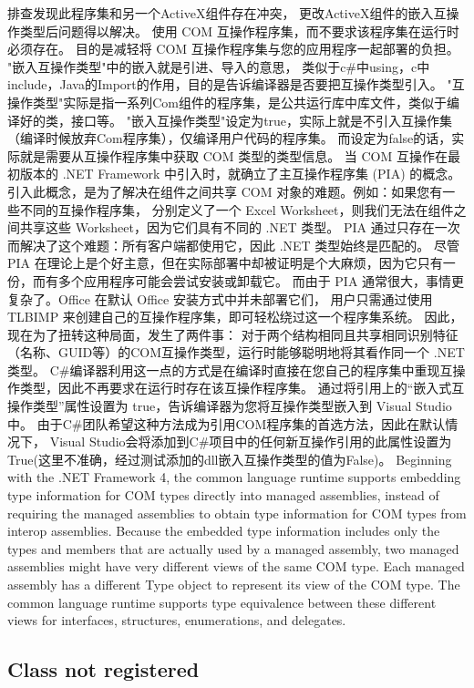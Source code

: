 \documentclass{book}
\begin{document}
排查发现此程序集和另一个ActiveX组件存在冲突，
更改ActiveX组件的嵌入互操作类型后问题得以解决。
使用 COM 互操作程序集，而不要求该程序集在运行时必须存在。
目的是减轻将 COM 互操作程序集与您的应用程序一起部署的负担。
"嵌入互操作类型"中的嵌入就是引进、导入的意思，
类似于c\#中using，c中include，Java的Import的作用，目的是告诉编译器是否要把互操作类型引入。
"互操作类型"实际是指一系列Com组件的程序集，是公共运行库中库文件，类似于编译好的类，接口等。
"嵌入互操作类型"设定为true，实际上就是不引入互操作集（编译时候放弃Com程序集），仅编译用户代码的程序集。
而设定为false的话，实际就是需要从互操作程序集中获取 COM 类型的类型信息。
当 COM 互操作在最初版本的 .NET Framework 中引入时，就确立了主互操作程序集 (PIA) 的概念。
引入此概念，是为了解决在组件之间共享 COM 对象的难题。例如：如果您有一些不同的互操作程序集，
分别定义了一个 Excel Worksheet，则我们无法在组件之间共享这些 Worksheet，因为它们具有不同的 .NET 类型。
PIA 通过只存在一次而解决了这个难题：所有客户端都使用它，因此 .NET 类型始终是匹配的。
尽管 PIA 在理论上是个好主意，但在实际部署中却被证明是个大麻烦，因为它只有一份，而有多个应用程序可能会尝试安装或卸载它。
而由于 PIA 通常很大，事情更复杂了。Office 在默认 Office 安装方式中并未部署它们，
用户只需通过使用 TLBIMP 来创建自己的互操作程序集，即可轻松绕过这一个程序集系统。
因此，现在为了扭转这种局面，发生了两件事：
对于两个结构相同且共享相同识别特征（名称、GUID等）的COM互操作类型，运行时能够聪明地将其看作同一个 .NET 类型。
C\#编译器利用这一点的方式是在编译时直接在您自己的程序集中重现互操作类型，因此不再要求在运行时存在该互操作程序集。
通过将引用上的“嵌入式互操作类型”属性设置为 true，告诉编译器为您将互操作类型嵌入到 Visual Studio 中。
由于C\#团队希望这种方法成为引用COM程序集的首选方法，因此在默认情况下，
Visual Studio会将添加到C\#项目中的任何新互操作引用的此属性设置为True(这里不准确，经过测试添加的dll嵌入互操作类型的值为False)。
Beginning with the .NET Framework 4, the common language runtime supports embedding type 
information for COM types directly into managed assemblies, 
instead of requiring the managed assemblies to obtain type information for COM types from interop assemblies.  
Because the embedded type information includes only the types and members that are actually used by a managed assembly, 
two managed assemblies might have very different views of the same COM type.  
Each managed assembly has a different Type object to represent its view of the COM type.  
The common language runtime supports type equivalence between these different views for interfaces,
 structures, enumerations, and delegates.  

\subsection{Class not registered}
\end{document}
